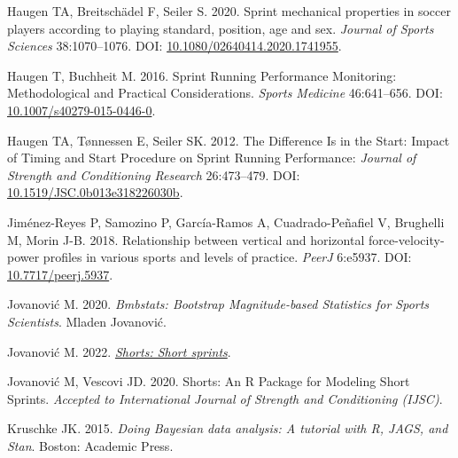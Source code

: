 \documentclass[fleqn,10pt]{wlpeerj} %
\newlength{\cslhangindent}
\newlength{\cslentryspacingunit} %
\newenvironment{CSLReferences}[2] %
 {%
  \setlength{\parindent}{0pt}
  \ifodd #1
  \let\oldpar\par
  \def\par{\hangindent=\cslhangindent\oldpar}
  \fi
  \setlength{\parskip}{#2\cslentryspacingunit}
 }%
 {}
\begin{document}
\begin{CSLReferences}{1}{0}
\leavevmode{}%
Haugen TA, Breitschädel F, Seiler S. 2020. Sprint mechanical properties in soccer players according to playing standard, position, age and sex. \emph{Journal of Sports Sciences} 38:1070--1076. DOI: \href{https://doi.org/10.1080/02640414.2020.1741955}{10.1080/02640414.2020.1741955}.

\leavevmode{}%
Haugen T, Buchheit M. 2016. Sprint {Running Performance Monitoring}: {Methodological} and {Practical Considerations}. \emph{Sports Medicine} 46:641--656. DOI: \href{https://doi.org/10.1007/s40279-015-0446-0}{10.1007/s40279-015-0446-0}.

\leavevmode{}%
Haugen TA, Tønnessen E, Seiler SK. 2012. The {Difference Is} in the {Start}: {Impact} of {Timing} and {Start Procedure} on {Sprint Running Performance}: \emph{Journal of Strength and Conditioning Research} 26:473--479. DOI: \href{https://doi.org/10.1519/JSC.0b013e318226030b}{10.1519/JSC.0b013e318226030b}.

\leavevmode{}%
Jiménez-Reyes P, Samozino P, García-Ramos A, Cuadrado-Peñafiel V, Brughelli M, Morin J-B. 2018. Relationship between vertical and horizontal force-velocity-power profiles in various sports and levels of practice. \emph{PeerJ} 6:e5937. DOI: \href{https://doi.org/10.7717/peerj.5937}{10.7717/peerj.5937}.

\leavevmode{}%
Jovanović M. 2020. \emph{Bmbstats: {Bootstrap Magnitude}-based {Statistics} for {Sports Scientists}}. {Mladen Jovanović}.

\leavevmode{}%
Jovanović M. 2022. \emph{\href{https://mladenjovanovic.github.io/shorts/}{Shorts: Short sprints}}.

\leavevmode{}%
Jovanović M, Vescovi JD. 2020. Shorts: {An R Package} for {Modeling Short Sprints}. \emph{Accepted to International Journal of Strength and Conditioning (IJSC)}.

\leavevmode{}%
Kruschke JK. 2015. \emph{Doing {Bayesian} data analysis: A tutorial with {R}, {JAGS}, and {Stan}}. {Boston}: {Academic Press}.


\end{CSLReferences}
\end{document}
